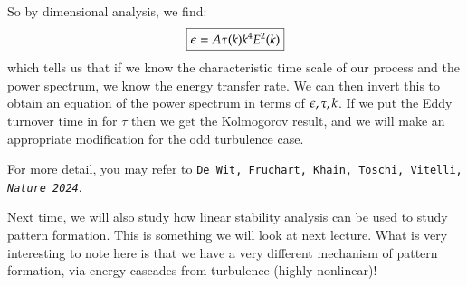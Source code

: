 So by dimensional analysis, we find:
\begin{equation}
    \boxed{\epsilon = A\tau(k)k^4 E^{2}(k)}
\end{equation}
which tells us that if we know the characteristic time scale of our process and the power spectrum, we know the energy transfer rate. We can then invert this to obtain an equation of the power spectrum in terms of $\epsilon, \tau, k$. If we put the Eddy turnover time in for $\tau$ then we get the Kolmogorov result, and we will make an appropriate modification for the odd turbulence case.

For more detail, you may refer to \texttt{De Wit, Fruchart, Khain, Toschi, Vitelli, \emph{Nature 2024}}.


Next time, we will also study how linear stability analysis can be used to study pattern formation. This is something we will look at next lecture. What is very interesting to note here is that we have a very different mechanism of pattern formation, via energy cascades from turbulence (highly nonlinear)! 